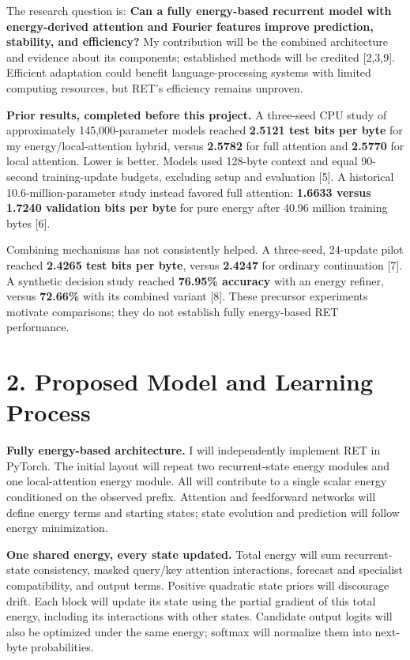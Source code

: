 \documentclass[11pt,letterpaper]{article}
\begin{document}
The research question is: \textbf{Can a fully energy-based recurrent model with energy-derived attention and Fourier features improve prediction, stability, and efficiency?} My contribution will be the combined architecture and evidence about its components; established methods will be credited [2,3,9]. Efficient adaptation could benefit language-processing systems with limited computing resources, but RET's efficiency remains unproven.

\textbf{Prior results, completed before this project.} A three-seed CPU study of approximately 145,000-parameter models reached \textbf{2.5121 test bits per byte} for my energy/local-attention hybrid, versus \textbf{2.5782} for full attention and \textbf{2.5770} for local attention. Lower is better. Models used 128-byte context and equal 90-second training-update budgets, excluding setup and evaluation [5]. A historical 10.6-million-parameter study instead favored full attention: \textbf{1.6633 versus 1.7240 validation bits per byte} for pure energy after 40.96 million training bytes [6].

Combining mechanisms has not consistently helped. A three-seed, 24-update pilot reached \textbf{2.4265 test bits per byte}, versus \textbf{2.4247} for ordinary continuation [7]. A synthetic decision study reached \textbf{76.95\% accuracy} with an energy refiner, versus \textbf{72.66\%} with its combined variant [8]. These precursor experiments motivate comparisons; they do not establish fully energy-based RET performance.

\newpage
\section*{2. Proposed Model and Learning Process}

\textbf{Fully energy-based architecture.} I will independently implement RET in PyTorch. The initial layout will repeat two recurrent-state energy modules and one local-attention energy module. All will contribute to a single scalar energy conditioned on the observed prefix. Attention and feedforward networks will define energy terms and starting states; state evolution and prediction will follow energy minimization.

\textbf{One shared energy, every state updated.} Total energy will sum recurrent-state consistency, masked query/key attention interactions, forecast and specialist compatibility, and output terms. Positive quadratic state priors will discourage drift. Each block will update its state using the partial gradient of this total energy, including its interactions with other states. Candidate output logits will also be optimized under the same energy; softmax will normalize them into next-byte probabilities.
\end{document}
